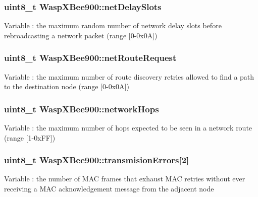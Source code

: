 \subsubsection[{\texorpdfstring{net\+Delay\+Slots}{netDelaySlots}}]{\setlength{\rightskip}{0pt plus 5cm}uint8\+\_\+t Wasp\+X\+Bee900\+::net\+Delay\+Slots}\hypertarget{class_wasp_x_bee900_a73e497e2c59c7b74098c6782987de83e}{}\label{class_wasp_x_bee900_a73e497e2c59c7b74098c6782987de83e}
Variable \+: the maximum random number of network delay slots before rebroadcasting a network packet (range \mbox{[}0-\/0x0A\mbox{]}) 
\subsubsection[{\texorpdfstring{net\+Route\+Request}{netRouteRequest}}]{\setlength{\rightskip}{0pt plus 5cm}uint8\+\_\+t Wasp\+X\+Bee900\+::net\+Route\+Request}\hypertarget{class_wasp_x_bee900_ae97fac397c1dde27d55c59d4320c79e9}{}\label{class_wasp_x_bee900_ae97fac397c1dde27d55c59d4320c79e9}
Variable \+: the maximum number of route discovery retries allowed to find a path to the destination node (range \mbox{[}0-\/0x0A\mbox{]}) 
\subsubsection[{\texorpdfstring{network\+Hops}{networkHops}}]{\setlength{\rightskip}{0pt plus 5cm}uint8\+\_\+t Wasp\+X\+Bee900\+::network\+Hops}\hypertarget{class_wasp_x_bee900_a2a1dec450eceab60aab8c44615566e2f}{}\label{class_wasp_x_bee900_a2a1dec450eceab60aab8c44615566e2f}
Variable \+: the maximum number of hops expected to be seen in a network route (range \mbox{[}1-\/0x\+FF\mbox{]}) 
\subsubsection[{\texorpdfstring{transmision\+Errors}{transmisionErrors}}]{\setlength{\rightskip}{0pt plus 5cm}uint8\+\_\+t Wasp\+X\+Bee900\+::transmision\+Errors\mbox{[}2\mbox{]}}\hypertarget{class_wasp_x_bee900_a5cc97a8a578c273096972e65229012ec}{}\label{class_wasp_x_bee900_a5cc97a8a578c273096972e65229012ec}
Variable \+: the number of M\+AC frames that exhaust M\+AC retries without ever receiving a M\+AC acknowledgement message from the adjacent node 

